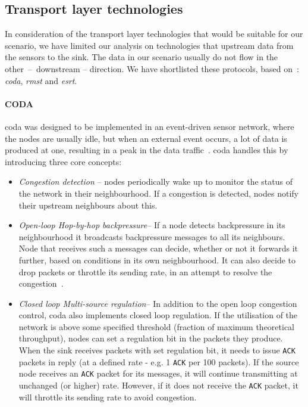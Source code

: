 \subsection{Transport layer technologies}

In consideration of the transport layer technologies that would be suitable for our scenario, we have limited our analysis on technologies that upstream data from the sensors to the sink. The data in our scenario usually do not flow in the other~--~downstream -- direction. We have shortlisted these protocols, based on~\cite{Sohraby2007WirelessApplications}: \textit{\acrfull{coda}}, \textit{\acrfull{rmst}} and \textit{\acrfull{esrt}}.

\paragraph{CODA}
\acrfull{coda} was designed to be implemented in an event-driven sensor network, where the nodes are usually idle, but when an external event occurs, a lot of data is produced at one, resulting in a peak in the data traffic~\cite{Wan2003CODA:Networks}. \acrshort{coda} handles this by introducing three core concepts:
\begin{itemize}[noitemsep]
    \item \textit{Congestion detection} -- nodes periodically wake up to monitor the status of the network in their neighbourhood. If a congestion is detected, nodes notify their upstream neighbours about this.
    \item \textit{Open-loop Hop-by-hop backpressure}\footnotemark -- If a node detects backpressure in its neighbourhood it broadcasts backpressure messages to all its neighbours. Node that receives such a messages can decide, whether or not it forwards it further, based on conditions in its own neighbourhood. It can also decide to drop packets or throttle its sending rate, in an attempt to resolve the congestion~\cite{Wan2003CODA:Networks}.
    \item \textit{Closed loop Multi-source regulation}\footnotemark -- In addition to the open loop congestion control, \acrshort{coda} also implements closed loop regulation. If the utilisation of the network is above some specified threshold (fraction of maximum theoretical throughput), nodes can set a regulation bit in the packets they produce. When the sink receives packets with set regulation bit, it needs to issue \texttt{ACK} packets in reply (at a defined rate - e.g. 1 \texttt{ACK} per 100 packets). If the source node receives an \texttt{ACK} packet for its messages, it will continue transmitting at unchanged (or higher) rate. However, if it does not receive the \texttt{ACK} packet, it will throttle its sending rate to avoid congestion.
\end{itemize}

